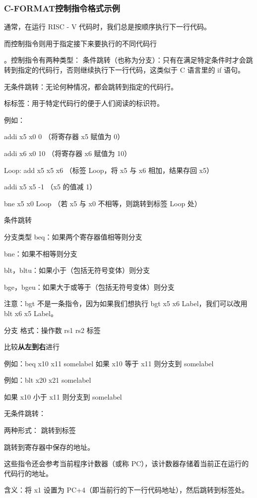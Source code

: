 \documentclass{ctexart}
\begin{document}
\subsubsection{C-FORMAT控制指令格式示例}\par
通常，在运行 RISC - V 代码时，我们总是按顺序执行下一行代码。\par
而控制指令则用于指定接下来要执行的不同代码行\par。控制指令有两种类型：
条件跳转（也称为分支）：只有在满足特定条件时才会跳转到指定的代码行，否则继续执行下一行代码，这类似于 C 语言里的 if 语句。\par
无条件跳转：无论何种情况，都会跳转到指定的代码行。\par
标标签：用于特定代码行的便于人们阅读的标识符。\par
例如：\par
addi x5 x0 0 （将寄存器 x5 赋值为 0）\par
addi x6 x0 10 （将寄存器 x6 赋值为 10）\par
Loop: add x5 x5 x6 （标签 Loop，将 x5 与 x6 相加，结果存回 x5）\par
addi x5 x5 -1 （x5 的值减 1）\par
bne x5 x0 Loop （若 x5 与 x0 不相等，则跳转到标签 Loop 处）\par
条件跳转\par
分支类型
beq：如果两个寄存器值相等则分支 \par
bne：如果不相等则分支 \par
blt，bltu：如果小于（包括无符号变体）则分支 \par
bge，bgeu：如果大于或等于（包括无符号变体）则分支 \par
注意：bgt 不是一条指令，因为如果我们想执行 bgt x5 x6 Label，我们可以改用 blt x6 x5 Label。 \par
分支
格式：操作数 rs1 rs2 标签 \par
比较\textbf{从左到右}进行 \par
例如：beq x10 x11 somelabel \pare
如果 x10 等于 x11 则分支到 somelabel \par
例如：blt x20 x21 somelabel \par
如果 x10 小于 x11 则分支到 somelabel \par
无条件跳转：\par
两种形式：
跳转到标签\par
跳转到寄存器中保存的地址。\par
这些指令还会参考当前程序计数器（或称 PC），该计数器存储着当前正在运行的代码行的地址。
\par  
含义：将 x1 设置为 PC+4（即当前行的下一行代码地址），然后跳转到标签处。\par
\end{document}
